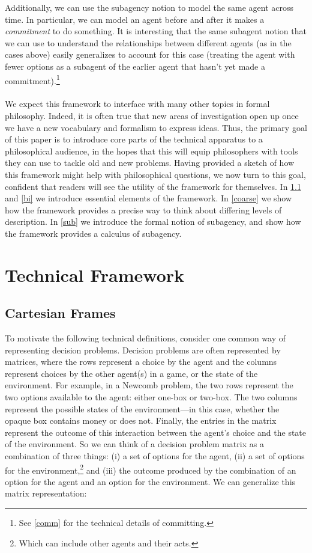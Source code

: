 \documentclass{article}
\begin{document}
Additionally, we can use the subagency notion to model the same agent across time. In particular, we can model an agent before and after it makes a \textit{commitment} to do something. It is interesting that the same subagent notion that we can use to understand the relationships between different agents (as in the cases above) easily generalizes to account for this case (treating the agent with fewer options as a subagent of the earlier agent that hasn't yet made a commitment).\footnote{See \cref{comm} for the technical details of committing.}
\\
\\
We expect this framework to interface with many other topics in formal philosophy. Indeed, it is often true that new areas of investigation open up once we have a new vocabulary and formalism to express ideas. Thus, the primary goal of this paper is to introduce core parts of the technical apparatus to a philosophical audience, in the hopes that this will equip philosophers with tools they can use to tackle old and new problems. Having provided a sketch of how this framework might help with philosophical questions, we now turn to this goal, confident that readers will see the utility of the framework for themselves. In \cref{CF} and \cref{bi} we introduce essential elements of the framework. In \cref{coarse} we show how the framework provides a precise way to think about differing levels of description. In \cref{sub} we introduce the formal notion of subagency, and show how the framework provides a calculus of subagency. 


\section{Technical Framework}
\label{tech}

\subsection{Cartesian Frames}
\label{CF}



To motivate the following technical definitions, consider one common way of representing decision problems.
Decision problems are often represented by matrices, where the rows represent a choice by the agent and the columns represent choices by the other agent(s) in a game, or the state of the environment.
For example, in a Newcomb problem, the two rows represent the two options available to the agent: either one-box or two-box.
The two columns represent the possible states of the environment---in this case, whether the opaque box contains money or does not.
Finally, the entries in the matrix represent the outcome of this interaction between the agent's choice and the state of the environment.
So we can think of a decision problem matrix as a combination of three things: (i) a set of options for the agent, (ii) a set of options for the environment,\footnote{Which can include other agents and their acts.} and (iii) the outcome produced by the combination of an option for the agent and an option for the environment.
We can generalize this matrix representation:
\end{document}
